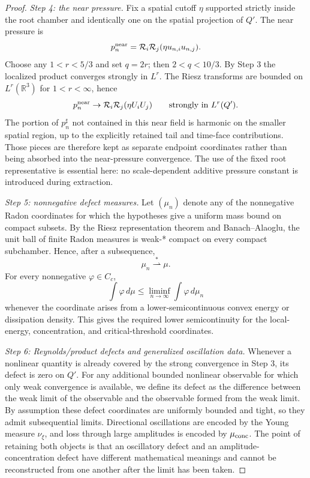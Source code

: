 \documentclass[11pt]{article}
\theoremstyle{definition}\newtheorem{problem}[theorem]{Problem}
\theoremstyle{definition}
\theoremstyle{remark}
\newcommand{\R}{\mathbb R}
\begin{document}
\begin{proof}
\emph{Step 4: the near pressure.}
Fix a spatial cutoff \(\eta\) supported strictly inside the root chamber and
identically one on the spatial projection of \(Q'\).  The near pressure is
\[
 p_n^{\rm near}=\mathcal R_i\mathcal R_j(\eta u_{n,i}u_{n,j}).
\]
Choose any \(1<r<5/3\) and set \(q=2r\); then \(2<q<10/3\).  By Step 3 the
localized product converges strongly in \(L^r\).  The Riesz transforms are
bounded on \(L^r(\R^3)\) for \(1<r<\infty\), hence
\[
 p_n^{\rm near}\to
 \mathcal R_i\mathcal R_j(\eta U_iU_j)
 \qquad\hbox{strongly in }L^r(Q').
\]
The portion of \(p_n^\sharp\) not contained in this near field is harmonic on
the smaller spatial region, up to the explicitly retained tail and time-face
contributions.  Those pieces are therefore kept as separate endpoint
coordinates rather than being absorbed into the near-pressure convergence.
The use of the fixed root representative is essential here: no scale-dependent
additive pressure constant is introduced during extraction.

\emph{Step 5: nonnegative defect measures.}
Let \((\mu_n)\) denote any of the nonnegative Radon coordinates for which the
hypotheses give a uniform mass bound on compact subsets.  By the Riesz
representation theorem and Banach--Alaoglu, the unit ball of finite Radon
measures is weak-* compact on every compact subchamber.  Hence, after a
subsequence,
\[
 \mu_n\stackrel{*}{\rightharpoonup}\mu.
\]
For every nonnegative \(\varphi\in C_c\),
\[
 \int\varphi\,d\mu
 \le \liminf_{n\to\infty}\int\varphi\,d\mu_n
\]
whenever the coordinate arises from a lower-semicontinuous convex energy or
dissipation density.  This gives the required lower semicontinuity for the
local-energy, concentration, and critical-threshold coordinates.

\emph{Step 6: Reynolds/product defects and generalized oscillation data.}
Whenever a nonlinear quantity is already covered by the strong convergence in
Step 3, its defect is zero on \(Q'\).  For any additional bounded nonlinear
observable for which only weak convergence is available, we define its defect
as the difference between the weak limit of the observable and the observable
formed from the weak limit.  By assumption these defect coordinates are
uniformly bounded and tight, so they admit subsequential limits.  Directional
oscillations are encoded by the Young measure \(\nu_\xi\), and loss through
large amplitudes is encoded by \(\mu_{\rm conc}\).  The point of retaining both
objects is that an oscillatory defect and an amplitude-concentration defect
have different mathematical meanings and cannot be reconstructed from one
another after the limit has been taken.


\end{proof}
\end{document}
